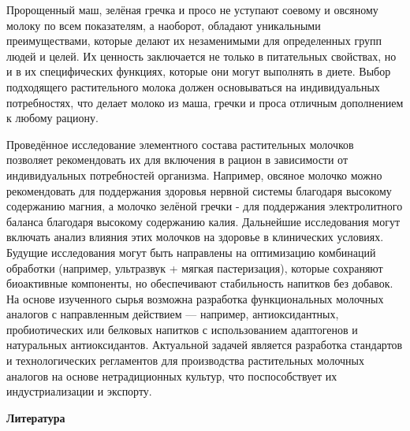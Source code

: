 \begin{multicols}{2}
Пророщенный маш, зелёная гречка и просо не уступают соевому и овсяному
молоку по всем показателям, а наоборот, обладают уникальными
преимуществами, которые делают их незаменимыми для определенных групп
людей и целей. Их ценность заключается не только в питательных
свойствах, но и в их специфических функциях, которые они могут выполнять
в диете. Выбор подходящего растительного молока должен основываться на
индивидуальных потребностях, что делает молоко из маша, гречки и проса
отличным дополнением к любому рациону.

Проведённое исследование элементного состава растительных молочков
позволяет рекомендовать их для включения в рацион в зависимости от
индивидуальных потребностей организма. Например, овсяное молочко можно
рекомендовать для поддержания здоровья нервной системы благодаря
высокому содержанию магния, а молочко зелёной гречки - для поддержания
электролитного баланса благодаря высокому содержанию калия. Дальнейшие
исследования могут включать анализ влияния этих молочков на здоровье в
клинических условиях. Будущие исследования могут быть направлены на
оптимизацию комбинаций обработки (например, ультразвук + мягкая
пастеризация), которые сохраняют биоактивные компоненты, но обеспечивают
стабильность напитков без добавок. На основе изученного сырья возможна
разработка функциональных молочных аналогов с направленным действием ---
например, антиоксидантных, пробиотических или белковых напитков с
использованием адаптогенов и натуральных антиоксидантов. Актуальной
задачей является разработка стандартов и технологических регламентов для
производства растительных молочных аналогов на основе нетрадиционных
культур, что поспособствует их индустриализации и экспорту.
\end{multicols}

\begin{center}
{\bfseries Литература}
\end{center}

